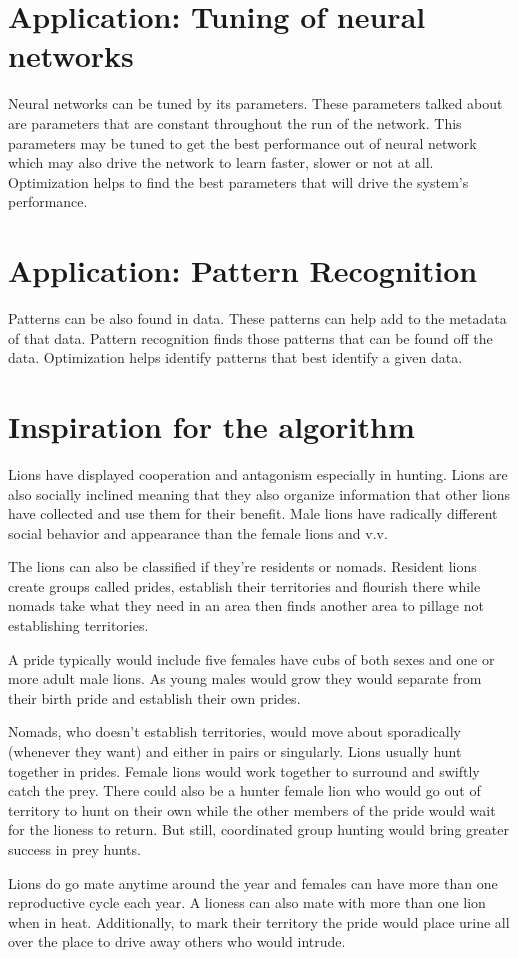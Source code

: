 \section{Application: Tuning of neural networks}
\par Neural networks can be tuned by its parameters. These parameters talked about are parameters that are constant throughout the run of the network. This parameters may be tuned to get the best performance out of neural network which may also drive the network to learn faster, slower or not at all. Optimization helps to find the best parameters that will drive the system's performance.

\section{Application: Pattern Recognition}
\par Patterns can be also found in data. These patterns can help add to the metadata of that data. Pattern recognition finds those patterns that can be found off the data. Optimization helps identify patterns that best identify a given data.

\section{Inspiration for the algorithm}
\par Lions have displayed cooperation and antagonism especially in hunting. Lions are also socially inclined meaning that they also organize information that other lions have collected and use them for their benefit.
Male lions have radically different social behavior and appearance than the female lions and v.v.
\par The lions can also be classified if they're residents or nomads. Resident lions create groups called prides, establish their territories and flourish there while nomads take what they need in an area then finds another area to pillage not establishing territories.
\par A pride typically would include five females have cubs of both sexes and one or more adult male lions.
As young males would grow they would separate from their birth pride and establish their own prides.
\par Nomads, who doesn't establish territories, would move about sporadically (whenever they want) and either in pairs or singularly.
Lions usually hunt together in prides. Female lions would work together to surround and swiftly catch the prey. There could also be a hunter female lion who would go out of territory to hunt on their own while the other members of the pride would wait for the lioness to return. But still, coordinated group hunting would bring greater success in prey hunts.\par
\par Lions do go mate anytime around the year and females can have more than one reproductive cycle each year. A lioness can also mate with more than one lion when in heat.
Additionally, to mark their territory the pride would place urine all over the place to drive away others who would intrude.

